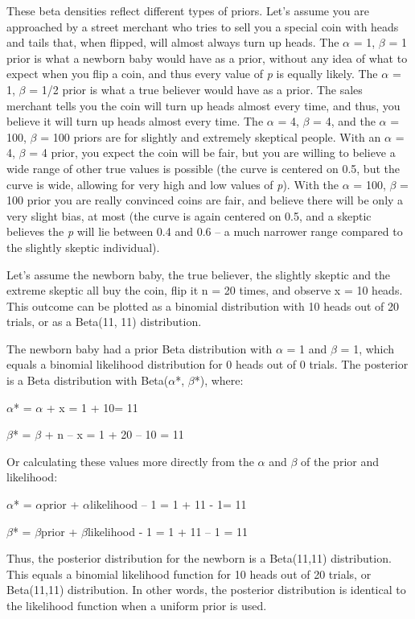 \documentclass[
  oneside]{krantz}
\begin{document}
These beta densities reflect different types of priors. Let's assume you are approached by a street merchant who tries to sell you a special coin with heads and tails that, when flipped, will almost always turn up heads. The \(\alpha\) = 1, \(\beta\) = 1 prior is what a newborn baby would have as a prior, without any idea of what to expect when you flip a coin, and thus every value of \emph{p} is equally likely. The \(\alpha\) = 1, \(\beta\) = 1/2 prior is what a true believer would have as a prior. The sales merchant tells you the coin will turn up heads almost every time, and thus, you believe it will turn up heads almost every time. The \(\alpha\) = 4, \(\beta\) = 4, and the \(\alpha\) = 100, \(\beta\) = 100 priors are for slightly and extremely skeptical people. With an \(\alpha\) = 4, \(\beta\) = 4 prior, you expect the coin will be fair, but you are willing to believe a wide range of other true values is possible (the curve is centered on 0.5, but the curve is wide, allowing for very high and low values of \emph{p}). With the \(\alpha\) = 100, \(\beta\) = 100 prior you are really convinced coins are fair, and believe there will be only a very slight bias, at most (the curve is again centered on 0.5, and a skeptic believes the \emph{p} will lie between 0.4 and 0.6 -- a much narrower range compared to the slightly skeptic individual).

Let's assume the newborn baby, the true believer, the slightly skeptic and the extreme skeptic all buy the coin, flip it n = 20 times, and observe x = 10 heads. This outcome can be plotted as a binomial distribution with 10 heads out of 20 trials, or as a Beta(11, 11) distribution.

The newborn baby had a prior Beta distribution with \(\alpha\) = 1 and \(\beta\) = 1, which equals a binomial likelihood distribution for 0 heads out of 0 trials. The posterior is a Beta distribution with Beta(\(\alpha\)*, \(\beta\)*), where:

\(\alpha\)* = \(\alpha\) + x = 1 + 10= 11

\(\beta\)* = \(\beta\) + n -- x = 1 + 20 -- 10 = 11

Or calculating these values more directly from the \(\alpha\) and \(\beta\) of the prior and
likelihood:

\(\alpha\)* = \(\alpha\)prior + \(\alpha\)likelihood -- 1 = 1 + 11 - 1= 11

\(\beta\)* = \(\beta\)prior + \(\beta\)likelihood - 1 = 1 + 11 -- 1 = 11

Thus, the posterior distribution for the newborn is a Beta(11,11) distribution. This equals a binomial likelihood function for 10 heads out of 20 trials, or Beta(11,11) distribution. In other words, the posterior distribution is identical to the likelihood function when a uniform prior is used.
\end{document}
